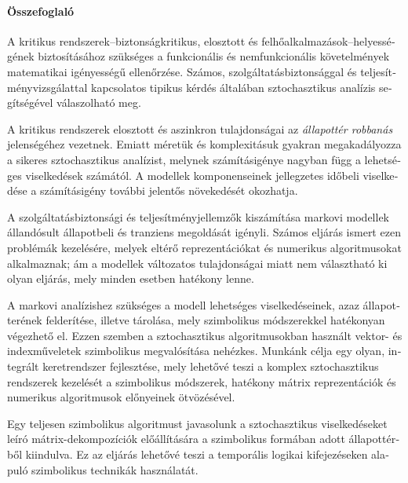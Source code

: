 \begin{otherlanguage}{magyar}

  \thispagestyle{plain}
  \paragraph*{Összefoglaló}

  A kritikus rendszerek\thinspace --\thinspace biztonságkritikus,
  elosztott és felhőalkalmazások\thinspace --\thinspace helyességének
  biztosításához szükséges a funkcionális és nemfunkcionális
  követelmények matematikai igényességű ellenőrzése. Számos,
  szolgáltatásbiztonsággal és teljesítményvizsgálattal kapcsolatos
  tipikus kérdés általában sztochasztikus analízis segítségével
  válaszolható meg.

  A kritikus rendszerek elosztott és aszinkron tulajdonságai az
  \emph{állapottér robbanás} jelenségéhez vezetnek. Emiatt méretük és
  komplexitásuk gyakran megakadályozza a sikeres sztochasztikus
  analízist, melynek számításigénye nagyban függ a lehetséges
  viselkedések számától. A modellek komponenseinek jellegzetes időbeli
  viselkedése a számításigény további jelentős növekedését okozhatja.

  A szolgáltatásbiztonsági és teljesítményjellemzők kiszámítása
  markovi modellek állandósult állapotbeli és tranziens megoldását
  igényli. Számos eljárás ismert ezen problémák kezelésére, melyek
  eltérő reprezentációkat és numerikus algoritmusokat
  alkalmaznak\hspace{1pt}; ám a modellek változatos tulajdonságai
  miatt nem választható ki olyan eljárás, mely minden esetben hatékony
  lenne.

  A markovi analízishez szükséges a modell lehetséges viselkedéseinek,
  azaz állapotterének felderítése, illetve tárolása, mely szimbolikus
  módszerekkel hatékonyan végezhető el. Ezzen szemben a sztochasztikus
  algoritmusokban használt vektor- és indexműveletek szimbolikus
  megvalósítása nehézkes. Munkánk célja egy olyan, integrált
  keretrendszer fejlesztése, mely lehetővé teszi a komplex
  sztochasztikus rendszerek kezelését a szimbolikus módszerek,
  hatékony mátrix reprezentációk és numerikus algoritmusok előnyeinek
  ötvözésével.

  Egy teljesen szimbolikus algoritmust javasolunk a sztochasztikus
  viselkedéseket leíró mátrix-dekompozíciók előállítására a
  szimbolikus formában adott állapottérből kiindulva. Ez az eljárás
  lehetővé teszi a temporális logikai kifejezéseken alapuló
  szimbolikus technikák használatát.


\end{otherlanguage}
